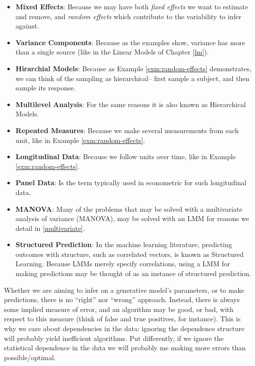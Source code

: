 \documentclass[]{book}
\theoremstyle{definition}
\theoremstyle{definition}
\theoremstyle{definition}
\theoremstyle{remark}
\begin{document}
\begin{itemize}
\item
  \textbf{Mixed Effects}:
  Because we may have both \emph{fixed effects} we want to estimate and remove, and \emph{random effects} which contribute to the variability to infer against.
\item
  \textbf{Variance Components}:
  Because as the examples show, variance has more than a single source (like in the Linear Models of Chapter \ref{lm}).
\item
  \textbf{Hirarchial Models}:
  Because as Example \ref{exm:random-effects} demonstrates, we can think of the sampling as hierarchical-- first sample a subject, and then sample its response.
\item
  \textbf{Multilevel Analysis}:
  For the same reasons it is also known as Hierarchical Models.
\item
  \textbf{Repeated Measures}:
  Because we make several measurements from each unit, like in Example \ref{exm:random-effects}.
\item
  \textbf{Longitudinal Data}:
  Because we follow units over time, like in Example \ref{exm:random-effects}.
\item
  \textbf{Panel Data}:
  Is the term typically used in econometric for such longitudinal data.
\item
  \textbf{MANOVA}:
  Many of the problems that may be solved with a multivariate analysis of variance (MANOVA), may be solved with an LMM for reasons we detail in \ref{multivariate}.
\item
  \textbf{Structured Prediction}:
  In the machine learning literature, predicting outcomes with structure, such as correlated vectors, is known as Structured Learning.
  Because LMMs merely specify correlations, using a LMM for making predictions may be thought of as an instance of structured prediction.
\end{itemize}

Whether we are aiming to infer on a generative model's parameters, or to make predictions, there is no ``right'' nor ``wrong'' approach. Instead, there is always some implied measure of error, and an algorithm may be good, or bad, with respect to this measure (think of false and true positives, for instance).
This is why we care about dependencies in the data: ignoring the dependence structure will probably yield inefficient algorithms.
Put differently, if we ignore the statistical dependence in the data we will probably me making more errors than possible/optimal.
\end{document}
